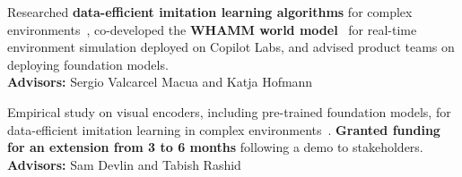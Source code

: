 \documentclass[a4paper,12pt]{article}
\begin{document}
\begin{expblock}
    Researched \textbf{data-efficient imitation learning algorithms} for complex environments~\cite{schaefer2026smartreplay,nath2026somjit,srblog2026}, co-developed the \textbf{WHAMM world model}~\cite{whamm2025} for real-time environment simulation deployed on Copilot Labs, and advised product teams on deploying foundation models.\\
    \textbf{Advisors:} Sergio Valcarcel Macua and Katja Hofmann
\end{expblock}


\begin{expblock}
    Empirical study on visual encoders, including pre-trained foundation models, for data-efficient imitation learning in complex environments~\cite{schaefer2025visual}. \textbf{Granted funding for an extension from 3 to 6 months} following a demo to stakeholders.\\
    \textbf{Advisors:} Sam Devlin and Tabish Rashid
\end{expblock}
\end{document}
